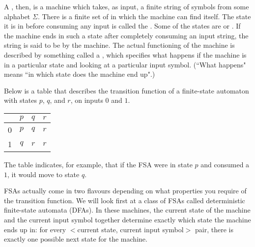 A , then, is a machine which takes, as input, 
a finite
string of symbols from some alphabet $\Sigma$.
There is a finite set of  in which the machine can find itself.  The
state it is in before consuming any input is called the .
Some of the states are 
or .  If the machine ends in such a state after completely consuming
an input string, the string is said to be  by the machine.
The actual functioning of the machine is described by something called a 
, which specifies 
what happens if the machine is in a particular state and looking at a
particular input symbol.  (``What happens" means ``in which state does the
machine end up".)    

\begin{example} Below is a table that describes the transition function of a 
finite-state automaton with states $p$, $q$, and $r$, on inputs $0$ and $1$.


\begin{center}
\begin{tabular}{|c||c|c|c|}
        \hline
        $\ $& $p$& $q$& $r$\\
        \hline
        \strut 0& $p$& $q$& $r$\\
        1& $q$& $r$& $r$\\
        \hline
     \end{tabular}
\end{center}

The table indicates, for example, 
that if the FSA were in state $p$ and consumed a $1$, it would
move to state $q$.
\end{example}
    
FSAs actually come in two flavours depending on what
properties you require of the transition function.  We will look first at a class
of FSAs called deterministic finite-state automata (DFAs).  In these
machines, the current state of the machine and the current input symbol together
determine exactly which state the machine ends up in: for every $<$current state,
current input symbol$>$ pair, there is exactly one possible next state for the
machine.

\smallskip

